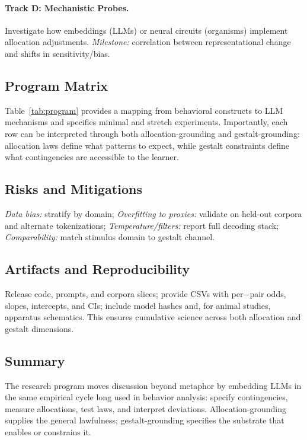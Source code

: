 \documentclass[11pt]{article}
\begin{document}
\paragraph{Track D: Mechanistic Probes.}
Investigate how embeddings (LLMs) or neural circuits (organisms) implement allocation adjustments.  
\emph{Milestone:} correlation between representational change and shifts in sensitivity/bias.

\subsection*{Program Matrix}
Table~\ref{tab:program} provides a mapping from behavioral constructs to LLM
mechanisms and specifies minimal and stretch experiments. Importantly, each row
can be interpreted through both allocation-grounding and gestalt-grounding:
allocation laws define what patterns to expect, while gestalt constraints define
what contingencies are accessible to the learner.

\subsection*{Risks and Mitigations}
\emph{Data bias:} stratify by domain; \emph{Overfitting to proxies:} validate
on held-out corpora and alternate tokenizations; \emph{Temperature/filters:}
report full decoding stack; \emph{Comparability:} match stimulus domain to
gestalt channel.

\subsection*{Artifacts and Reproducibility}
Release code, prompts, and corpora slices; provide CSVs with per$-$pair odds,
slopes, intercepts, and CIs; include model hashes and, for animal studies,
apparatus schematics. This ensures cumulative science across both allocation and
gestalt dimensions.

\subsection*{Summary}
The research program moves discussion beyond metaphor by embedding LLMs in the
same empirical cycle long used in behavior analysis: specify contingencies,
measure allocations, test laws, and interpret deviations. Allocation-grounding
supplies the general lawfulness; gestalt-grounding specifies the substrate that
enables or constrains it.
\end{document}
